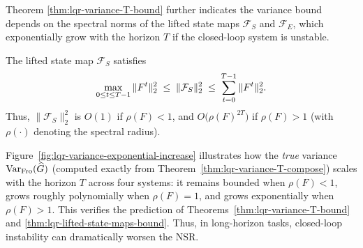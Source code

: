 
Theorem \ref{thm:lqr-variance-T-bound} further indicates the variance bound depends on the spectral norms of the lifted state maps \(\mathcal F_S\) and \(\mathcal F_E\), which exponentially grow with the horizon \(T\) if the closed-loop system is unstable. 

\begin{theorem}
  \label{thm:lqr-lifted-state-maps-bound}
  The lifted state map $\mathcal F_S$ satisfies
  \begin{align}
    \vspace{-2mm}
    \max_{0\le t\le T-1}\|F^t\|_2^2
    \;\le\;
    \|\mathcal F_S\|_2^2
    \;\le\;
    \sum_{t=0}^{T-1}\|F^t\|_2^2. \label{eq:FS-sandwich}
    \vspace{-2mm}
  \end{align}
  Thus, $\|\mathcal F_S\|_2^2$ is $O(1)$ if $\rho(F)<1$, and $O\big(\rho(F)^{2T}\big)$ if $\rho(F)>1$ (with \(\rho(\cdot)\) denoting the spectral radius).
\end{theorem}
Figure~\ref{fig:lqr-variance-exponential-increase} illustrates how the \emph{true} variance $\operatorname{Var_{Fro}}(\widehat G)$ (computed exactly from Theorem~\ref{thm:lqr-variance-T-compose}) scales with the horizon $T$ across four systems: it remains bounded when $\rho(F)<1$, grows roughly polynomially when $\rho(F)=1$, and grows exponentially when $\rho(F)>1$. This verifies the prediction of Theorems~\ref{thm:lqr-variance-T-bound} and \ref{thm:lqr-lifted-state-maps-bound}.
Thus, in long-horizon tasks, closed-loop instability can dramatically worsen the NSR.

